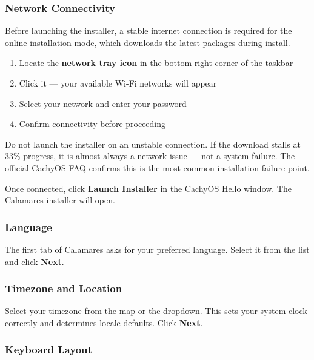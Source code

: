 \documentclass{article}
\begin{document}
\subsubsection{Network Connectivity}

Before launching the installer, a stable internet connection is required for the
online installation mode, which downloads the latest packages during install.

\begin{enumerate}[leftmargin=1.5em, nosep, label={\arabic*.}]
  \item Locate the \textbf{network tray icon} in the bottom-right corner of the taskbar
  \item Click it --- your available Wi-Fi networks will appear
  \item Select your network and enter your password
  \item Confirm connectivity before proceeding
\end{enumerate}

\begin{tcolorbox}[arc=12pt, outer arc=10pt,
  colback=red!5!white, colframe=red!60!black,
  title=\textbf{Warning}]
  Do not launch the installer on an unstable connection. If the download stalls at
  33\% progress, it is almost always a network issue --- not a system failure. The
  \href{https://wiki.cachyos.org/cachyos_basic/faq/}{official CachyOS FAQ} confirms this is the most common installation failure point.
\end{tcolorbox}

\noindent Once connected, click \textbf{Launch Installer} in the CachyOS Hello window. The Calamares installer will open.

\subsubsection{Language}

The first tab of Calamares asks for your preferred language. Select it from the list
and click \textbf{Next}.

\subsubsection{Timezone and Location}

Select your timezone from the map or the dropdown. This sets your system clock
correctly and determines locale defaults. Click \textbf{Next}.

\subsubsection{Keyboard Layout}
\end{document}
